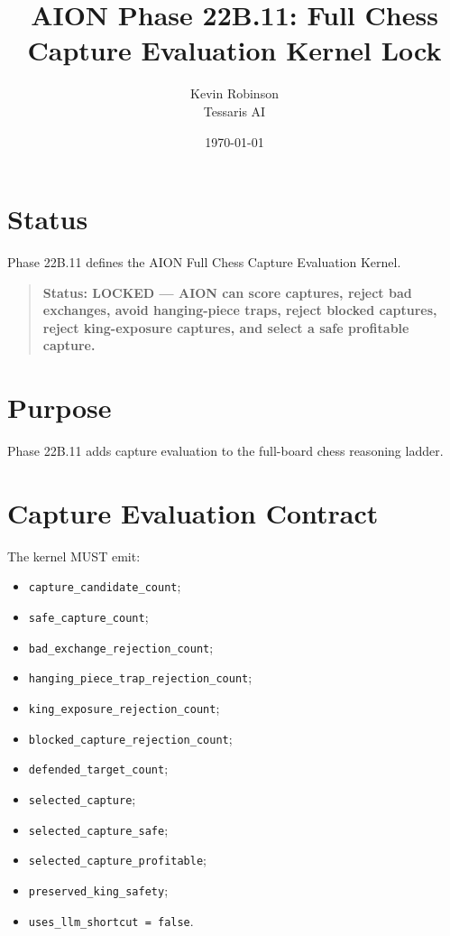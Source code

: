 \documentclass[11pt,a4paper]{article}
\title{\textbf{AION Phase 22B.11: Full Chess Capture Evaluation Kernel Lock}}
\author{Kevin Robinson\\Tessaris AI}
\date{\today}
\begin{document}
\maketitle

\section{Status}

Phase 22B.11 defines the AION Full Chess Capture Evaluation Kernel.

\begin{quote}
\textbf{Status: LOCKED --- AION can score captures, reject bad exchanges, avoid hanging-piece traps, reject blocked captures, reject king-exposure captures, and select a safe profitable capture.}
\end{quote}

\section{Purpose}

Phase 22B.11 adds capture evaluation to the full-board chess reasoning ladder.

\section{Capture Evaluation Contract}

The kernel MUST emit:

\begin{itemize}
  \item \texttt{capture\_candidate\_count};
  \item \texttt{safe\_capture\_count};
  \item \texttt{bad\_exchange\_rejection\_count};
  \item \texttt{hanging\_piece\_trap\_rejection\_count};
  \item \texttt{king\_exposure\_rejection\_count};
  \item \texttt{blocked\_capture\_rejection\_count};
  \item \texttt{defended\_target\_count};
  \item \texttt{selected\_capture};
  \item \texttt{selected\_capture\_safe};
  \item \texttt{selected\_capture\_profitable};
  \item \texttt{preserved\_king\_safety};
  \item \texttt{uses\_llm\_shortcut = false}.
\end{itemize}
\end{document}
